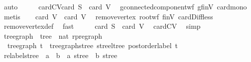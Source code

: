 \begin{isabellebody}
\ auto\isanewline
\ \ \isamarkupfalse%
\ \isamarkupfalse%
\ card{\isacharunderscore}{\kern0pt}C{\isacharunderscore}{\kern0pt}V{\isacharprime}{\kern0pt}{\isacharcolon}{\kern0pt}{\isachardoublequoteopen}card\ S\ {\isasymle}\ card\ V{\isacharprime}{\kern0pt}{\isachardoublequoteclose}\ \isamarkupfalse%
\ g{\isacharprime}{\kern0pt}{\isachardot}{\kern0pt}connected{\isacharunderscore}{\kern0pt}component{\isacharunderscore}{\kern0pt}wf\ g{\isacharprime}{\kern0pt}{\isachardot}{\kern0pt}finV\ card{\isacharunderscore}{\kern0pt}mono\ \isamarkupfalse%
\ metis\isanewline
\ \ \isamarkupfalse%
\ {\isachardoublequoteopen}card\ V{\isacharprime}{\kern0pt}\ {\isacharless}{\kern0pt}\ card\ V{\isachardoublequoteclose}\ \isamarkupfalse%
\ remove{\isacharunderscore}{\kern0pt}vertex\ root{\isacharunderscore}{\kern0pt}wf\ finV\ card{\isacharunderscore}{\kern0pt}Diff{}{\isacharunderscore}{\kern0pt}less\ \isamarkupfalse%
\ remove{\isacharunderscore}{\kern0pt}vertex{\isacharunderscore}{\kern0pt}def\ \isamarkupfalse%
\ fast\isanewline
\ \ \isamarkupfalse%
\ \isamarkupfalse%
\ {\isachardoublequoteopen}card\ S\ {\isacharless}{\kern0pt}\ card\ V{\isachardoublequoteclose}\ \isamarkupfalse%
\ card{\isacharunderscore}{\kern0pt}C{\isacharunderscore}{\kern0pt}V{\isacharprime}{\kern0pt}\ \isamarkupfalse%
\ simp\isanewline
{}\isamarkupfalse%
%
\endisatagproof
{\isafoldproof}%
%
\isadelimproof
\isanewline
%
\endisadelimproof
\isanewline
{}\isamarkupfalse%
\ tree{\isacharunderscore}{\kern0pt}graph\ {\isacharcolon}{\kern0pt}{\isacharcolon}{\kern0pt}\ {\isachardoublequoteopen}tree\ {\isasymRightarrow}\ nat\ rpregraph{\isachardoublequoteclose}\ \isanewline
\ \ {\isachardoublequoteopen}tree{\isacharunderscore}{\kern0pt}graph\ t\ {\isacharequal}{\kern0pt}\ tree{\isacharunderscore}{\kern0pt}graph{\isacharunderscore}{\kern0pt}stree\ {\isacharparenleft}{\kern0pt}stree{\isacharunderscore}{\kern0pt}ltree\ {\isacharparenleft}{\kern0pt}postorder{\isacharunderscore}{\kern0pt}label\ t{\isacharparenright}{\kern0pt}{\isacharparenright}{\kern0pt}{\isachardoublequoteclose}\isanewline
\isanewline
{}\isamarkupfalse%
\ relabel{\isacharunderscore}{\kern0pt}stree\ {\isacharcolon}{\kern0pt}{\isacharcolon}{\kern0pt}\ {\isachardoublequoteopen}{\isacharparenleft}{\kern0pt}{\isacharprime}{\kern0pt}a\ {\isasymRightarrow}\ {\isacharprime}{\kern0pt}b{\isacharparenright}{\kern0pt}\ {\isasymRightarrow}\ {\isacharprime}{\kern0pt}a\ stree\ {\isasymRightarrow}\ {\isacharprime}{\kern0pt}b\ stree{\isachardoublequoteclose}\ \isanewline

\end{isabellebody}
